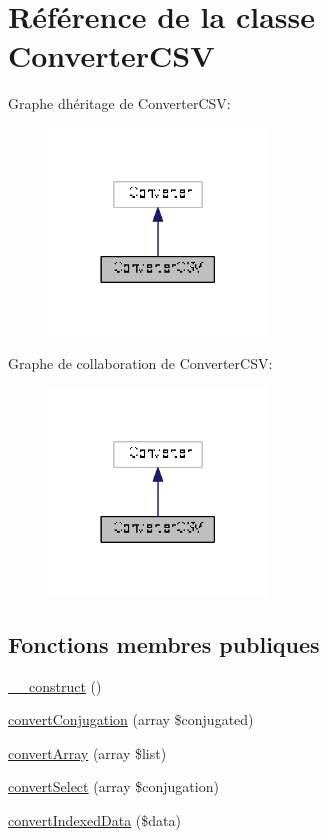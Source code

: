 \hypertarget{class_converter_c_s_v}{}\section{Référence de la classe Converter\+C\+SV}
\label{class_converter_c_s_v}


Graphe d\textquotesingle{}héritage de Converter\+C\+SV\+:
\nopagebreak
\begin{figure}[H]
\begin{center}
\leavevmode
\includegraphics[width=165pt]{class_converter_c_s_v__inherit__graph}
\end{center}
\end{figure}


Graphe de collaboration de Converter\+C\+SV\+:
\nopagebreak
\begin{figure}[H]
\begin{center}
\leavevmode
\includegraphics[width=165pt]{class_converter_c_s_v__coll__graph}
\end{center}
\end{figure}
\subsection*{Fonctions membres publiques}
\begin{DoxyCompactItemize}
\item 
\hyperlink{class_converter_c_s_v_ad4fff7f9fd8e69926e394576558776f7}{\+\_\+\+\_\+construct} ()
\item 
\hyperlink{class_converter_c_s_v_aff168b6953b8c9bdf43280c70e9c7170}{convert\+Conjugation} (array \$conjugated)
\item 
\hyperlink{class_converter_c_s_v_a5bf7f48e54520210eeebdc2eb8f9e222}{convert\+Array} (array \$list)
\item 
\hyperlink{class_converter_c_s_v_a36a4e52151f3326f7ed9f347dd30cdeb}{convert\+Select} (array \$conjugation)
\item 
\hyperlink{class_converter_c_s_v_a66253359624a5be3a4f5df9761b980a7}{convert\+Indexed\+Data} (\$data)
\end{DoxyCompactItemize}


